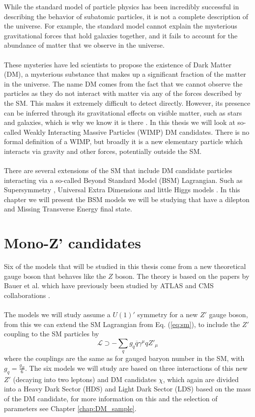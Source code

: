 \documentclass[12pt, a4paper]{book}
\begin{document}
While the standard model of particle physics has been incredibly successful in describing the behavior of subatomic particles, it is not a complete description of the universe. For example, the standard model cannot explain the mysterious gravitational forces that hold galaxies together, 
and it fails to account for the abundance of matter that we observe in the universe.\\
\\These mysteries have led scientists to propose the existence of Dark Matter (DM), a mysterious substance that makes up a significant fraction of the matter in the universe. The name DM comes from the fact that we cannot observe the particles as they do not interact with matter via any of the 
forces described by the SM. This makes it extremely difficult to detect directly. However, its presence can be inferred through its gravitational effects on visible matter, such as stars and galaxies, which is why we know it is there \cite{DM1, DM2}. In this thesis we will look at so-called 
Weakly Interacting Massive Particles (WIMP) DM candidates. There is no formal definition of a WIMP, but broadly it is a new elementary particle which interacts via gravity and other forces, potentially outside the SM.\\
\\There are several extensions of the SM that include DM candidate particles interacting via a so-called Beyond Standard Model (BSM) Lagrangian. Such as Supersymmetry \cite{JUNGMAN1996195},  Universal Extra Dimensions \cite{DIENES199947} and little Higgs models \cite{ARKANIHAMED2001232}. 
In this chapter we will present the BSM models we will be studying that have a dilepton and Missing Transverse Energy final state.

\section{Mono-Z' candidates}
Six of the models that will be studied in this thesis come from a new theoretical gauge boson that behaves like the $Z$ boson. The theory is based on the papers by Bauer et al. \cite{ Zp_DM_candidate2} which have previously been studied by ATLAS \cite{Zp_DM_candidate3} and CMS collaborations \cite{Zp_DM_candidate1}. \\
\\The models we will study assume a $U(1)'$ symmetry for a new $Z'$ gauge boson, from this we can extend the SM Lagrangian from Eq. (\ref{eq:sm}), to include the $Z'$ coupling to the SM particles by
\begin{equation}\label{eq:Zpq}
    \mathcal{L}\supset -\sum_q g_q \overline{q}\gamma^\mu q Z'_\mu
\end{equation}
where the couplings are the same as for gauged baryon number in the SM, with $g_q=\frac{g_B}{6}$. The six models we will study are based on three interactions of this new $Z'$ (decaying into two leptons) and DM candidates $\chi$, which again are divided into a Heavy Dark Sector (HDS) and Light Dark Sector (LDS) based on the mass of 
the DM candidate, for more information on this and the selection of parameters see Chapter \ref{chap:DM_sample}.
\end{document}
